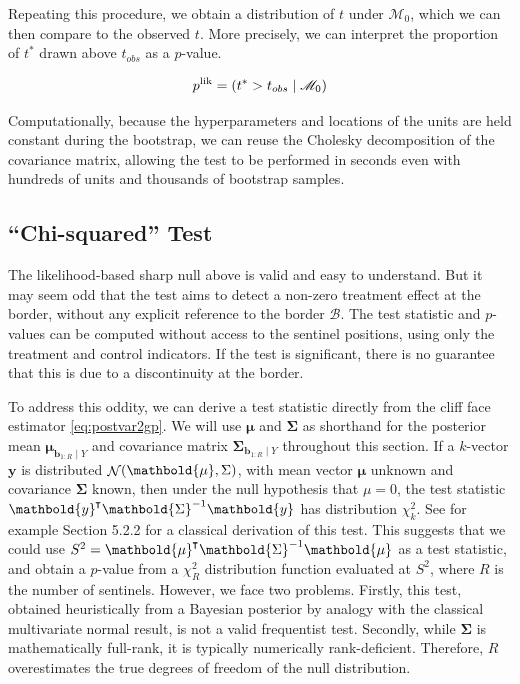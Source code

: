 \documentclass[letter]{article}
\DeclarePairedDelimiter{\parenthesis}{\lparen}{\rparen}
\newcommand{\del}[1]{\parenthesis*{#1}}
\let\Pr\relax
\DeclareMathOperator{\Pr}{\mathbb{P}}
\DeclareMathOperator{\normal}{\mathcal{N}}
\newcommand*{\trans}{^{\mkern-1.5mu\intercal}}
\newcommand{\yvec}{\mathbold{y}}
\newcommand{\muvec}{\mathbold{\mu}}
\newcommand{\border}{\mathcal{B}}
\newcommand{\sentinel}{\bm{b}}
\newcommand{\numsent}{R}
\newcommand{\sentinels}{\sentinel_{1:\numsent}}
\newcommand{\modnull}{\mathscr{M}_0}
\newcommand{\SigmaMat}{\mathbold{\Sigma}}
\renewcommand{\cite}[1]{\citet{#1}}
\begin{document}
Repeating this procedure, we obtain a distribution of \(t\) under \(\modnull\),
which we can then compare to the observed \(t\).
More precisely, we can interpret the proportion of \(t^*\) drawn above \(t_{obs}\) as a \(p\)-value.

\begin{equation}
    p^{\mathrm{lik}} = \Pr\del{t^* > t_{obs} \mid \modnull}
\end{equation}

Computationally, because the hyperparameters and locations of the units are held constant during the bootstrap, we can reuse the Cholesky decomposition of the covariance matrix, allowing the test to be performed in seconds even with hundreds of units and thousands of bootstrap samples.
    


    	\subsection{\texorpdfstring{``Chi-squared'' Test}{Chi-squared Test}}\label{chi-squared-test}

The likelihood-based sharp null above is valid and easy to understand.
But it may seem odd that the test aims to detect a non-zero treatment effect at the border, without any explicit reference to the border \(\border\).
The test statistic and \(p\)-values can be computed without access to the sentinel positions, using only the treatment and control indicators.
If the test is significant, there is no guarantee that this is due to a discontinuity at the border.

To address this oddity, we can derive a test statistic directly from the cliff face estimator \eqref{eq:postvar2gp}.
We will use \(\muvec\) and \(\SigmaMat\) as shorthand for the posterior mean \(\muvec_{\sentinels \mid Y}\)
and covariance matrix \(\SigmaMat_{\sentinels \mid Y}\) throughout this section.
If a \(k\)-vector \(\yvec\) is distributed \(\normal\del{\muvec, \Sigma}\), with mean vector \(\muvec\) unknown and covariance \(\SigmaMat\) known, then under the null hypothesis that \(\mu=0\), the test statistic \(\yvec\trans \SigmaMat^{-1} \yvec\) has distribution \(\chi^2_k\).
See for example \cite{rencher2003methods} Section 5.2.2 for a classical derivation of this test.
This suggests that we could use \(S^2=\muvec\trans \SigmaMat^{-1} \muvec\) as a test statistic,
and obtain a \(p\)-value from a \(\chi^2_\numsent\) distribution function evaluated at \(S^2\), where \(\numsent\) is the number of sentinels.
However, we face two problems.
Firstly, this test, obtained heuristically from a Bayesian posterior by analogy with the classical multivariate normal result, is not a valid frequentist test.
Secondly, while \(\SigmaMat\) is mathematically full-rank, it is typically numerically rank-deficient.
Therefore, \(\numsent\) overestimates the true degrees of freedom of the null distribution.
\end{document}
